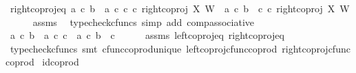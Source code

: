 \begin{isabellebody}
\ right{\isacharunderscore}{\kern0pt}coproj{\isacharunderscore}{\kern0pt}eq{\isacharcolon}{\kern0pt}\ {\isachardoublequoteopen}{\isacharparenleft}{\kern0pt}{\isacharparenleft}{\kern0pt}a\ {\isasymcirc}\isactrlsub c\ b{\isacharparenright}{\kern0pt}\ {\isasymamalg}\ {\isacharparenleft}{\kern0pt}a\ {\isasymcirc}\isactrlsub c\ c{\isacharparenright}{\kern0pt}{\isacharparenright}{\kern0pt}\ {\isasymcirc}\isactrlsub c\ {\isacharparenleft}{\kern0pt}right{\isacharunderscore}{\kern0pt}coproj\ X\ W{\isacharparenright}{\kern0pt}\ {\isacharequal}{\kern0pt}\ {\isacharparenleft}{\kern0pt}a\ {\isasymcirc}\isactrlsub c\ {\isacharparenleft}{\kern0pt}b\ {\isasymamalg}\ c{\isacharparenright}{\kern0pt}{\isacharparenright}{\kern0pt}\ {\isasymcirc}\isactrlsub c\ {\isacharparenleft}{\kern0pt}right{\isacharunderscore}{\kern0pt}coproj\ X\ W{\isacharparenright}{\kern0pt}{\isachardoublequoteclose}\isanewline
\ \ \ \ \isamarkupfalse%
\ assms\ \isamarkupfalse%
\ {\isacharparenleft}{\kern0pt}typecheck{\isacharunderscore}{\kern0pt}cfuncs{\isacharcomma}{\kern0pt}\ simp\ add{\isacharcolon}{\kern0pt}\ comp{\isacharunderscore}{\kern0pt}associative{}{\isacharparenright}{\kern0pt}\isanewline
\isanewline
\ \ \isamarkupfalse%
\ {\isachardoublequoteopen}{\isacharparenleft}{\kern0pt}a\ {\isasymcirc}\isactrlsub c\ b{\isacharparenright}{\kern0pt}\ {\isasymamalg}\ {\isacharparenleft}{\kern0pt}a\ {\isasymcirc}\isactrlsub c\ c{\isacharparenright}{\kern0pt}\ {\isacharequal}{\kern0pt}\ a\ {\isasymcirc}\isactrlsub c\ {\isacharparenleft}{\kern0pt}b\ {\isasymamalg}\ c{\isacharparenright}{\kern0pt}{\isachardoublequoteclose}\isanewline
\ \ \ \ \isamarkupfalse%
\ assms\ left{\isacharunderscore}{\kern0pt}coproj{\isacharunderscore}{\kern0pt}eq\ right{\isacharunderscore}{\kern0pt}coproj{\isacharunderscore}{\kern0pt}eq\isanewline
\ \ \ \ \isamarkupfalse%
\ {\isacharparenleft}{\kern0pt}typecheck{\isacharunderscore}{\kern0pt}cfuncs{\isacharcomma}{\kern0pt}\ smt\ cfunc{\isacharunderscore}{\kern0pt}coprod{\isacharunderscore}{\kern0pt}unique\ left{\isacharunderscore}{\kern0pt}coproj{\isacharunderscore}{\kern0pt}cfunc{\isacharunderscore}{\kern0pt}coprod\ right{\isacharunderscore}{\kern0pt}coproj{\isacharunderscore}{\kern0pt}cfunc{\isacharunderscore}{\kern0pt}coprod{\isacharparenright}{\kern0pt}\isanewline
{}\isamarkupfalse%
%
\endisatagproof
{\isafoldproof}%
%
\isadelimproof
\isanewline
%
\endisadelimproof
\isanewline
{}\isamarkupfalse%
\ id{\isacharunderscore}{\kern0pt}coprod{\isacharcolon}{\kern0pt}\isanewline

\end{isabellebody}
